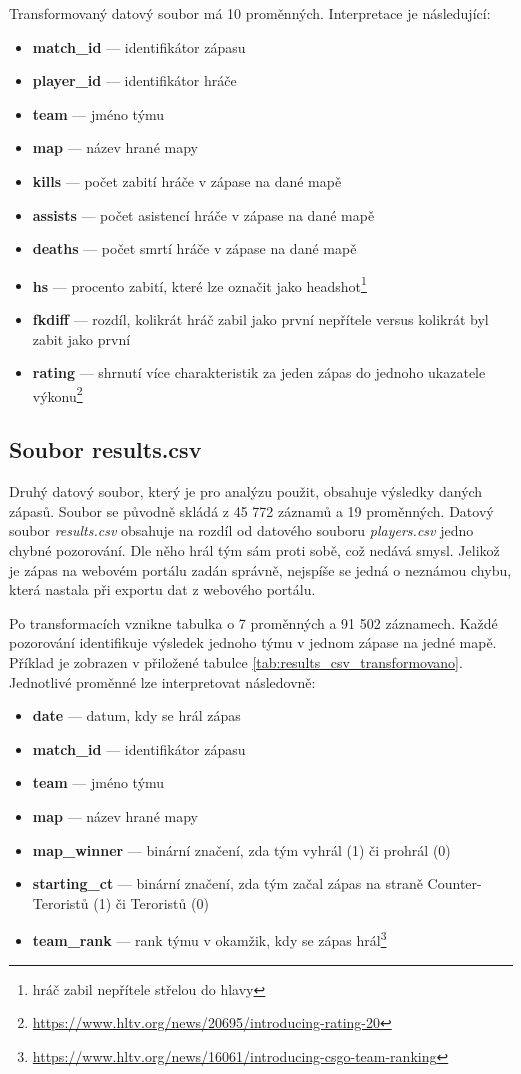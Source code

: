 \newpage
Transformovaný 
datový soubor
má 10 proměnných. Interpretace je následující:
\begin{itemize}
    \item \textbf{match\_id} --- identifikátor zápasu
    \item \textbf{player\_id} --- identifikátor hráče
    \item \textbf{team} --- jméno týmu
    \item \textbf{map} --- název hrané mapy
    \item \textbf{kills} --- počet zabití hráče v zápase na dané mapě
    \item \textbf{assists} --- počet asistencí hráče v zápase na dané mapě
    \item \textbf{deaths} --- počet smrtí hráče v zápase na dané mapě
    \item \textbf{hs} --- procento zabití, které lze označit jako headshot\footnote{hráč zabil nepřítele střelou do hlavy}
    \item \textbf{fkdiff} --- rozdíl, kolikrát hráč zabil jako první nepřítele versus kolikrát byl zabit jako první
    \item \textbf{rating} --- shrnutí více charakteristik za jeden zápas do jednoho ukazatele výkonu\footnote{\url{https://www.hltv.org/news/20695/introducing-rating-20}}
\end{itemize}

\subsection{Soubor results.csv}
Druhý datový soubor, který je pro analýzu použit, obsahuje výsledky daných zápasů. Soubor se původně skládá z 45 772 záznamů a 19 proměnných. Datový soubor 
\textit{results.csv} obsahuje na rozdíl od datového souboru \textit{players.csv} jedno chybné pozorování. Dle něho hrál tým sám proti sobě, což nedává smysl.
Jelikož je zápas na webovém portálu zadán správně, nejspíše se jedná o neznámou chybu, která nastala při exportu dat z webového portálu.

Po transformacích vznikne tabulka o 7 proměnných a 91 502 záznamech. Každé pozorování identifikuje výsledek jednoho týmu v jednom zápase
na jedné mapě. Příklad je zobrazen v přiložené tabulce \ref{tab:results_csv_transformovano}. Jednotlivé proměnné lze interpretovat následovně:
\begin{itemize}
    \item \textbf{date} --- datum, kdy se hrál zápas
    \item \textbf{match\_id} --- identifikátor zápasu
    \item \textbf{team} --- jméno týmu
    \item \textbf{map} --- název hrané mapy
    \item \textbf{map\_winner} --- binární značení, zda tým vyhrál (1) či prohrál (0)
    \item \textbf{starting\_ct} --- binární značení, zda tým začal zápas na straně Counter-Teroristů (1) či Teroristů (0)
    \item \textbf{team\_rank} --- rank týmu v okamžik, kdy se zápas hrál\footnote{\url{https://www.hltv.org/news/16061/introducing-csgo-team-ranking}}
\end{itemize}

